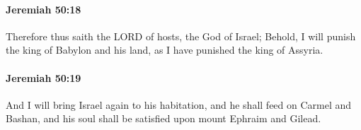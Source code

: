 		\paragraph{Jeremiah 50:18} %
			\label{JEREMIAH-50-18}

			Therefore thus saith the LORD of hosts, the God of Israel; Behold, I will punish the king of Babylon and his land, as I have punished the king of Assyria.


		\paragraph{Jeremiah 50:19} %
			\label{JEREMIAH-50-19}

			And I will bring Israel again to his habitation, and he shall feed on Carmel and Bashan, and his soul shall be satisfied upon mount Ephraim and Gilead.


